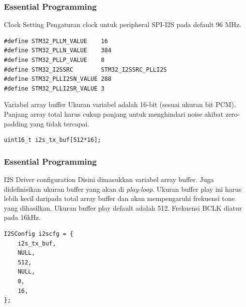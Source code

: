 \documentclass[table,dvipsnames,10pt]{beamer}
\begin{document}
	\begin{frame}[fragile]
	\frametitle{Essential Programming}
	\begin{exampleblock}{Clock Setting} 
		Pengaturan clock untuk peripheral SPI-I2S pada default 96 MHz.
		\begin{verbatim}
#define STM32_PLLM_VALUE    16
#define STM32_PLLN_VALUE    384
#define STM32_PLLP_VALUE    8
#define STM32_I2SSRC        STM32_I2SSRC_PLLI2S
#define STM32_PLLI2SN_VALUE 288
#define STM32_PLLI2SR_VALUE 3
		\end{verbatim}
	\end{exampleblock}

	\begin{exampleblock}{Variabel array buffer} 
		Ukuran variabel adalah 16-bit (sesuai ukuran bit PCM).
		Panjang array total harus cukup panjang untuk menghindari
		noise akibat zero-padding yang tidak tercapai.
		\begin{verbatim}
uint16_t i2s_tx_buf[512*16];
		\end{verbatim}
	\end{exampleblock}
	\end{frame}

	\begin{frame}[fragile]
	\frametitle{Essential Programming}
	\begin{exampleblock}{I2S Driver configuration} 
		Disini dimasukkan variabel array buffer.
		Juga didefinisikan ukuran buffer yang akan di \textit{play-loop}.
		Ukuran buffer play ini harus lebih kecil daripada total array buffer
		dan akan mempengaruhi frekuensi tone yang dihasilkan.
		Ukuran buffer play default adalah 512.
		Frekuensi BCLK diatur pada 16kHz.
		\begin{verbatim}
I2SConfig i2scfg = {
	i2s_tx_buf,
	NULL,
	512,
	NULL,
	0,
	16,
};
		\end{verbatim}
	\end{exampleblock}
	\end{frame}
\end{document}

